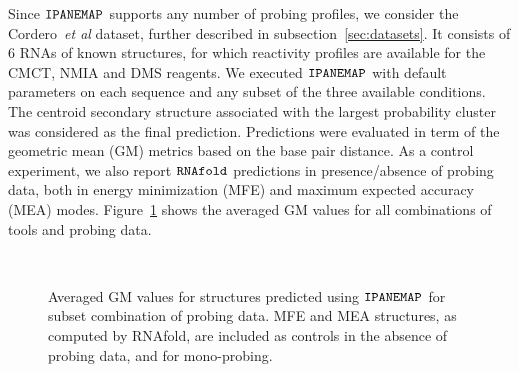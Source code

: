\documentclass[a4,center,fleqn]{NAR}
\newcommand{\Software}[1]{$\text{\ttfamily #1}$}
\newcommand{\OurTool}{\Software{IPANEMAP}\xspace}
\begin{document}
Since \OurTool{} supports any number of probing profiles, we consider the Cordero~\emph{et al} dataset, further described in subsection~\ref{sec:datasets}. It consists of 6 RNAs of known structures, for which reactivity profiles are available for the CMCT, NMIA and DMS reagents. We executed \OurTool{} with default parameters on each sequence and any subset of the three available conditions. The centroid secondary structure  associated with the largest probability cluster was considered as the final prediction. Predictions were evaluated in term of the geometric mean (GM) metrics based on the base pair distance. As a control experiment, we also report ${\tt RNAfold}$ predictions in presence/absence of probing data, both in energy minimization (MFE) and maximum expected accuracy (MEA) modes. Figure~\ref{cordero1} shows the averaged GM values for all combinations of tools and probing data.



\begin{figure}
	{\\}
	
	\caption{Averaged GM values for structures  predicted using \OurTool{} for subset combination of probing data. MFE and MEA structures, as computed by RNAfold, are included as controls in the absence of probing data, and for mono-probing.}
	\label{cordero1}
\end{figure}
\end{document}

